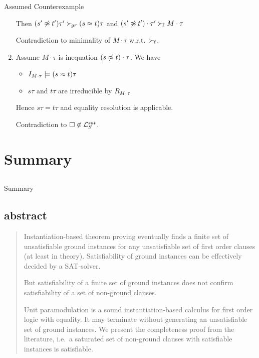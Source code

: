 \documentclass[%
handout,
]{beamer}
\begin{document}
\begin{frame}[allowframebreaks]{Assumed Counterexample}
\begin{enumerate}
        Then $(s'\not\approx t')\tau'\mathrel\succ_{\!gr} (s\approx t)\tau$ and $(s'\not\approx t')\cdot\tau'\mathrel\succ_{\!\ell} M\cdot\tau$

        Contradiction to minimality of $M\cdot\tau$ w.r.t.~$\mathrel\succ_{\!\ell}$.
        \vspace{0.5em}

        \item Assume $M\cdot\tau$ is inequation $(s\not\approx t)\cdot\tau$. We have
        \begin{itemize}
            \item $I_{M\cdot\tau}\models (s\approx t)\tau$
            \item $s\tau$ and $t\tau$ are irreducible by $R_{M\cdot\tau}$
        \end{itemize}
        Hence $s\tau = t\tau$ and equality resolution is applicable.

        Contradiction to $\square\not\in\mathcal{L}_S^{sat}$.
    \end{enumerate}

\end{frame}

\section{Summary}
\subsection{}
\begin{frame}{Summary}

\end{frame}

\subsection{abstract}
\begin{frame}
    \begin{abstract}
        Instantiation-based theorem proving eventually finds a finite set of unsatisfiable ground
        instances for any unsatisfiable set of first order clauses (at least in theory).
        Satisfiability of ground instances can be effectively decided by a SAT-solver.
        \vspace{0.7em}

        But satisfiability of a finite set of ground instances does not confirm satisfiability
        of a set of non-ground clauses.
        \vspace{0.7em}

        Unit paramodulation is a sound instantiation-based calculus
        for first order logic with equality. It may terminate
        without generating an unsatisfiable set of ground instances.
        We present the completeness proof from the literature,
        i.e.~a saturated set of non-ground clauses
        with satisfiable instances is satisfiable.




    \end{abstract}
\end{frame}
\end{document}

